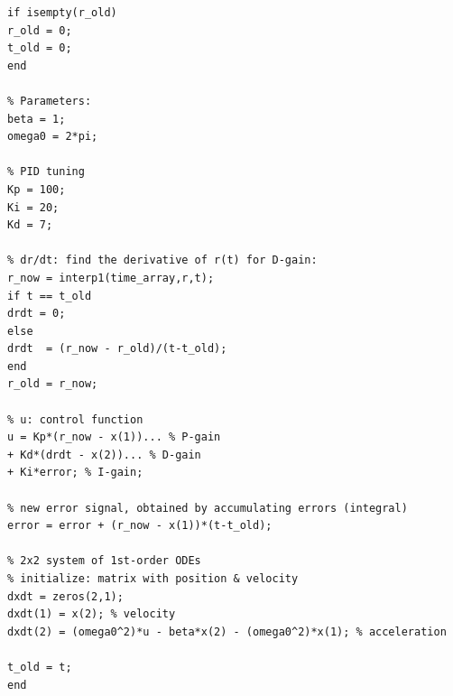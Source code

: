 \documentclass{article}
\theoremstyle{definition}
\begin{document}
\begin{lstlisting}
if isempty(r_old)
r_old = 0;
t_old = 0;
end

% Parameters:
beta = 1;
omega0 = 2*pi;

% PID tuning
Kp = 100;
Ki = 20;
Kd = 7;

% dr/dt: find the derivative of r(t) for D-gain:
r_now = interp1(time_array,r,t);
if t == t_old
drdt = 0;
else
drdt  = (r_now - r_old)/(t-t_old);
end
r_old = r_now;

% u: control function
u = Kp*(r_now - x(1))... % P-gain
+ Kd*(drdt - x(2))... % D-gain
+ Ki*error; % I-gain;

% new error signal, obtained by accumulating errors (integral)
error = error + (r_now - x(1))*(t-t_old);

% 2x2 system of 1st-order ODEs
% initialize: matrix with position & velocity
dxdt = zeros(2,1);
dxdt(1) = x(2); % velocity
dxdt(2) = (omega0^2)*u - beta*x(2) - (omega0^2)*x(1); % acceleration

t_old = t;
end
\end{lstlisting}




\nocite{bechhoefer2005feedback}
\nocite{zwierleinPID}



 

\end{document}
